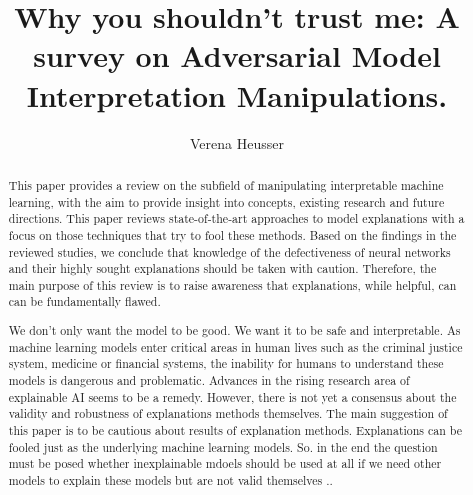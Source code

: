 \documentclass[sigconf]{acmart}
\begin{document}
\title{Why you shouldn't trust me: A survey on Adversarial Model Interpretation Manipulations.}

\author{Verena Heusser}


\begin{abstract}

  This paper provides a review on the subfield of manipulating interpretable machine learning, with the aim to provide insight into concepts, existing research and future directions.  
  This paper reviews state-of-the-art approaches to model explanations with a focus on those techniques that try to 
  fool these methods. Based on the findings in the reviewed studies, we conclude that knowledge of the defectiveness of neural networks and their highly sought explanations should be taken with caution. Therefore, the main purpose of this review is to raise awareness that explanations, while helpful, can can be fundamentally flawed.

  We don't only want the model to be good. We want it to be safe and interpretable. 
  As machine learning models enter critical areas in human lives such as the criminal justice system, medicine or financial systems, the inability for humans to understand these models is dangerous and problematic. Advances in the rising research area of explainable AI seems to be a remedy. However, there is not yet a consensus about the validity and robustness of explanations methods themselves. The main suggestion of this paper is to be cautious about results of explanation methods. Explanations can be fooled just as the underlying machine learning models. So. in the end the question must be posed whether inexplainable mdoels should be used at all if we need other models to explain these models but are not valid themselves .. %



\end{abstract}
\end{document}
